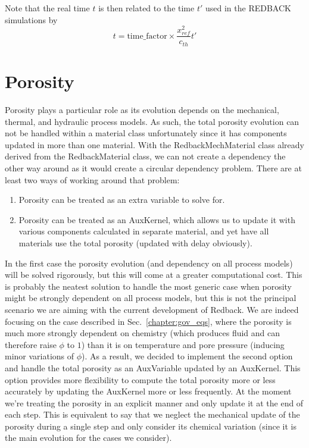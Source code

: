 \documentclass[]{scrreprt}
\newcommand{\redback}{{REDBACK}}
\begin{document}
Note that the real time $t$ is then related to the time $t'$ used in the \redback{} simulations by 
\begin{equation}
  t = \text{time\_factor}\times\frac{x^2_{ref}}{c_{th}}t'
\end{equation}

\section{Porosity}
Porosity plays a particular role as its evolution depends on the mechanical, thermal, and hydraulic process models. As such, the total porosity evolution can not be handled within a material class unfortunately since it has components updated in more than one material. With the RedbackMechMaterial class already derived from the RedbackMaterial class, we can not create a dependency the other way around as it would create a circular dependency problem. There are at least two ways of working around that problem:
\begin{enumerate}
\item Porosity can be treated as an extra variable to solve for. 
\item Porosity can be treated as an AuxKernel, which allows us to update it with various components calculated in separate material, and yet have all materials use the total porosity (updated with delay obviously).
\end{enumerate}
In the first case the porosity evolution (and dependency on all process models) will be solved rigorously, but this will come at a greater computational cost. This is probably the neatest solution to handle the most generic case when porosity might be strongly dependent on all process models, but this is not the principal scenario we are aiming with the current development of Redback. We are indeed focusing on the case described in Sec.~\ref{chapter:gov_eqs}, where the porosity is much more strongly dependent on chemistry (which produces fluid and can therefore raise $\phi$ to $1$) than it is on temperature and pore pressure (inducing minor variations of $\phi$). As a result, we decided to implement the second option and handle the total porosity as an AuxVariable updated by an AuxKernel. This option provides more flexibility to compute the total porosity more or less accurately by updating the AuxKernel more or less frequently. At the moment we're treating the porosity in an explicit manner and only update it at the end of each step. This is equivalent to say that we neglect the mechanical update of the porosity during a single step and only consider its chemical variation (since it is the main evolution for the cases we consider).
\end{document}

